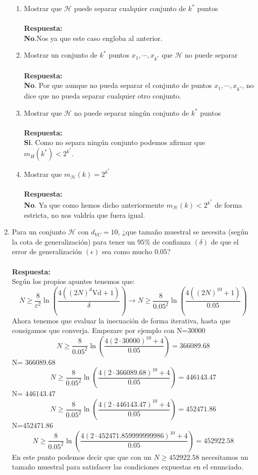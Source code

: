 \documentclass[12pt,a4paper]{article}
\begin{document}
\begin{enumerate}
\begin{enumerate}
	\item Mostrar que $\mathcal{H}$ puede separar cualquier conjunto de $k^{*}$ puntos
	\\\\\textbf{Respuesta: }\\\textbf{No}.Nos ya que este caso engloba al anterior.

	\item Mostrar un conjunto de $k^{*}$ puntos $x_1 , \cdots, x_{k^{*}}$  que  $\mathcal{H}$ no puede separar
	\\\\\textbf{Respuesta: }\\\textbf{No}. Por que aunque no pueda separar el conjunto de puntos $x_1 , \cdots, x_{k^{*}}$, no dice que no  pueda separar cualquier otro conjunto.
	
	\item Mostrar que $\mathcal{H}$ no puede separar ningún conjunto de  $k^{*}$ puntos
	\\\\\textbf{Respuesta: }\\\textbf{Si}. Como no separa ningún conjunto podemos afirmar que $m_{H}\left(k^{*}\right)<2^{k^{*}}$.
	
	\item Mostrar que $m_{\mathcal{H}}(k) = 2^{k^{*}}$
	\\\\\textbf{Respuesta: }\\\textbf{No}. Ya que como hemos dicho anteriormente  $m_{\mathcal{H}}(k) < 2^{k^{*}}$ de forma estricta, no nos valdría que fuera igual.
\end{enumerate}
\item Para un conjunto $\mathcal{H}$ con $d_{VC} = 10$, ¿que tamaño muestral se necesita (según la cota de
generalización) para tener un $95\%$ de confianza $(\delta)$ de que el error de generalización $(\epsilon)$
sea como mucho $0.05$?	\\\\\textbf{Respuesta: }\\
Según los propios apuntes tenemos que:
$$N \geq \frac{8}{\varepsilon^{2}} \ln \left(\frac{4\left((2 N)^{d} \mathrm{Vd}+1\right)}{\delta}\right) \rightarrow N \geq \frac{8}{0.05^{2}} \ln \left(\frac{4\left((2 N)^{10} +1\right)}{0.05}\right)$$
Ahora tenemos que evaluar la inecuación de forma iterativa, hasta que consigamos que converja.
Empezare por ejemplo con N=30000
$$N \geq\frac{8}{0.05^{2}} \ln \left(\frac{4(2 \cdot 30000)^{10}+4}{0.05}\right) = 366089.68$$
 N= 366089.68
 $$N \geq\frac{8}{0.05^{2}} \ln \left(\frac{4(2 \cdot 366089.68)^{10}+4}{0.05}\right) =446143.47$$
  N= 446143.47
   $$N \geq\frac{8}{0.05^{2}} \ln \left(\frac{4(2 \cdot 446143.47)^{10}+4}{0.05}\right) =452471.86$$
   N=452471.86
      $$N \geq\frac{8}{0.05^{2}} \ln \left(\frac{4(2 \cdot 452471.859999999986)^{10}+4}{0.05}\right) =452922.58$$
      En este punto podemos decir que que con un $N\geq 452922.58$ necesitamos un tamaño muestral para satisfacer las condiciones expuestas en el enunciado.
      

\end{enumerate}
\end{document}
